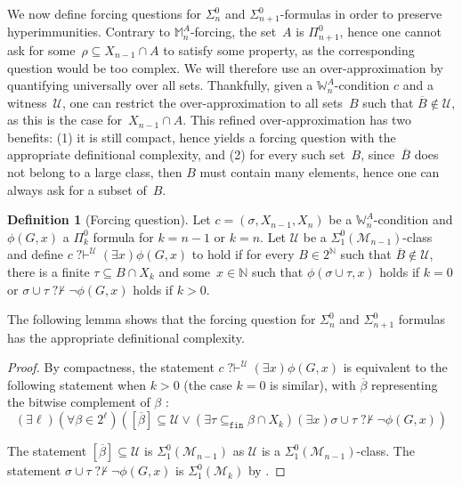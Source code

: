 \documentclass{article}
\def\NN{\mathbb{N}}
\def\WW{\mathbb{W}}
\def\MM{\mathbb{M}}
\def\U{\mathcal{U}}
\def\M{\mathcal{M}}
\newcommand{\qvdash}{\operatorname{{?}{\vdash}}}
\newcommand{\nqvdash}{\operatorname{{?}{\nvdash}}}
\newcommand{\finsub}{\subseteq_{\mathtt{fin}}}
\numberwithin{theorem}{section}
\newtheorem{lemma}[theorem]{Lemma}
\theoremstyle{definition}
\newtheorem{definition}[theorem]{Definition}
\begin{document}
We now define forcing questions for $\Sigma^0_n$ and $\Sigma^0_{n+1}$-formulas in order to preserve hyperimmunities. Contrary to $\MM^A_n$-forcing, the set~$A$ is $\Pi^0_{n+1}$, hence one cannot ask for some~$\rho \subseteq X_{n-1} \cap A$ to satisfy some property, as the corresponding question would be too complex. We will therefore use an over-approximation by quantifying universally over all sets. Thankfully, given a $\WW^A_n$-condition $c$ and a witness~$\U$, one can restrict the over-approximation to all sets~$B$ such that $\overline{B} \not \in \U$, as this is the case for~$X_{n-1} \cap A$. This refined over-approximation has two benefits: (1) it is still compact, hence yields a forcing question with the appropriate definitional complexity, and (2) for every such set~$B$, since~$\overline{B}$ does not belong to a large class, then $B$ must contain many elements, hence one can always ask for a subset of~$B$.

\begin{definition}[Forcing question]
    Let $c = (\sigma,X_{n-1},X_n)$ be a $\WW^A_n$-condition and $\phi(G,x)$ a $\Pi_k^0$ formula for $k = n - 1$ or $k = n$. Let $\U$ be a $\Sigma_1^0(\M_{n-1})$-class and define $c \qvdash^\U (\exists x)\phi(G,x)$ to hold if for every $B \in 2^\NN$ such that $\overline{B} \not \in \U$, there is a finite $\tau \subseteq B \cap X_{k}$ and some~$x \in \NN$ such that $\phi(\sigma \cup \tau,x)$ holds if $k = 0$ or  $\sigma \cup \tau \nqvdash \neg \phi(G,x)$ holds if $k > 0$.
\end{definition}

The following lemma shows that the forcing question for $\Sigma^0_n$ and $\Sigma^0_{n+1}$ formulas has the appropriate definitional complexity.


\begin{proof}
By compactness, the statement $c \qvdash^\U (\exists x) \phi(G,x)$ is equivalent to the following statement when $k > 0$ (the case $k = 0$ is similar), with $\overline{\beta}$ representing the bitwise complement of $\beta$ :
$$(\exists \ell)(\forall \beta \in 2^{\ell})([\overline{\beta}] \subseteq \U \vee (\exists \tau \finsub \beta \cap X_k)(\exists x)\sigma \cup \tau \nqvdash \neg \phi(G,x))$$

The statement $[\overline{\beta}] \subseteq \U$ is $\Sigma_1^0(\M_{n-1})$ as $\U$ is a $\Sigma_1^0(\M_{n-1})$-class. The statement $\sigma \cup \tau \nqvdash \neg \phi(G,x)$ is $\Sigma_1^0(\M_k)$ by .
\end{proof}
\end{document}
